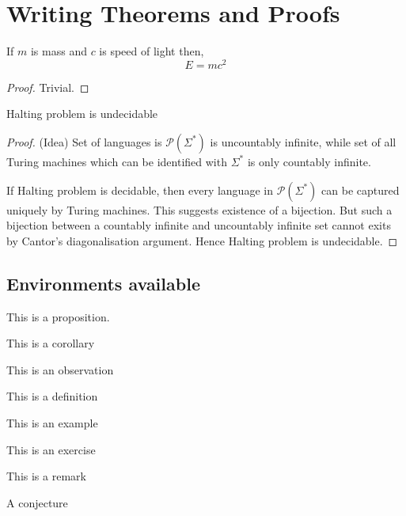 \section{Writing Theorems and Proofs} \label{sec:rel}
\begin{theorem} \label{cl:relativity}
If $m$ is mass and $c$ is speed of light then, 
\begin{equation} \label{eq:relativity}
E = mc^2
\end{equation}

\end{theorem}
\begin{proof}
Trivial. 
\end{proof}

\begin{claim} 
Halting problem is undecidable
\end{claim}
\begin{proof}(Idea)
Set of languages is $\mathcal{P}(\Sigma^*)$ is uncountably infinite,
while set of all Turing machines which can be identified with 
$\Sigma^*$ is only countably infinite. 

If Halting problem is 
decidable, then every language in $\mathcal{P}(\Sigma^*)$ can be 
captured uniquely by Turing machines. This suggests existence of a 
bijection. But such a bijection between a countably infinite 
and uncountably infinite set cannot exits by Cantor's diagonalisation argument. 
Hence Halting problem is undecidable.
\end{proof}

\subsection{Environments available}
\begin{proposition}
This is a proposition.
\end{proposition}
\begin{corollary}
	This is a corollary
\end{corollary}
\begin{observation}
	This is an observation
\end{observation}
\begin{definition}
	This is a definition
\end{definition}
\begin{example}
	This is an example
\end{example}
\begin{exercise}
	This is an exercise
\end{exercise}
\begin{remark}
	This is a remark
\end{remark}
\begin{conjecture}
	A conjecture
\end{conjecture}

